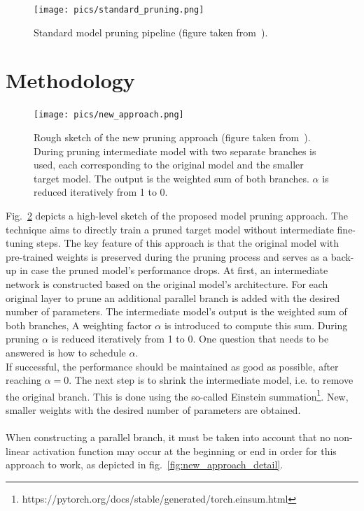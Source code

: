 \documentclass[10pt,twocolumn,letterpaper]{article}
\begin{document}
\begin{figure}[hpbt]
	\centering
	\texttt{[image: pics/standard\_pruning.png]}
	\caption[]{Standard model pruning pipeline (figure taken from~\cite{Mart2020}).
	}
	\label{fig:standard_pruning}
\end{figure}

\section{Methodology}\label{sec:methodology}
\begin{figure}[hpbt]
	\centering
	\texttt{[image: pics/new\_approach.png]}
	\caption[]{Rough sketch of the new pruning approach (figure taken from~\cite{Khan2020}).
		During pruning intermediate model with two separate branches is used, each corresponding to the original model and the smaller target model.
		The output is the weighted sum of both branches.
		$\alpha$ is reduced iteratively from 1 to 0.
	}
	\label{fig:new_approach_highlevel}
\end{figure}
\noindent Fig.~\ref{fig:new_approach_highlevel} depicts a high-level sketch of the proposed model pruning approach.
The technique aims to directly train a pruned target model without intermediate fine-tuning steps.
The key feature of this approach is that the original model with pre-trained weights is preserved during the pruning process and serves as a back-up in case the pruned model's performance drops.
At first, an intermediate network is constructed based on the original model's architecture.
For each original layer to prune an additional parallel branch is added with the desired number of parameters.
The intermediate model's output is the weighted sum of both branches,
A weighting factor $\alpha$ is introduced to compute this sum.
During pruning $\alpha$ is reduced iteratively from 1 to 0.
One question that needs to be answered is how to schedule $\alpha$.\\
If successful, the performance should be maintained as good as possible, after reaching $\alpha=0$.
The next step is to shrink the intermediate model, i.e. to remove the original branch.
This is done using the so-called Einstein summation\footnote{https://pytorch.org/docs/stable/generated/torch.einsum.html}.
New, smaller weights with the desired number of parameters are obtained.\\\\
When constructing a parallel branch, it must be taken into account that no non-linear activation function may occur at the beginning or end in order for this approach to work, as depicted in fig.~\ref{fig:new_approach_detail}.
\end{document}

